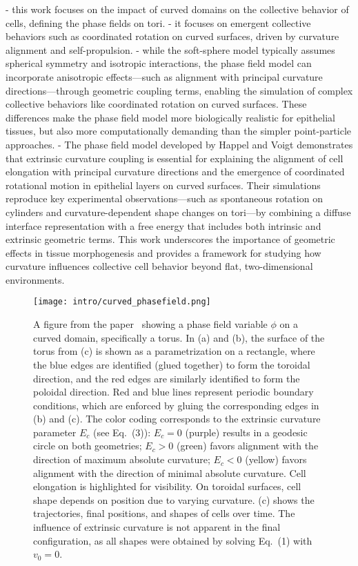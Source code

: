 - this work focuses on the impact of curved domains on the collective behavior of cells, defining the phase fields on tori. 
- it focuses on emergent collective behaviors such as coordinated rotation on curved surfaces, driven by curvature alignment and self-propulsion. 
- while the soft-sphere model typically assumes spherical symmetry and isotropic interactions, the phase field model can incorporate anisotropic effects—such as alignment with principal curvature directions—through geometric coupling terms, enabling the simulation of complex collective behaviors like coordinated rotation on curved surfaces. 
These differences make the phase field model more biologically realistic for epithelial tissues, but also more computationally demanding than the simpler point-particle approaches. 
- The phase field model developed by Happel and Voigt \cite{HV23} demonstrates that extrinsic curvature coupling is essential for explaining the alignment of cell elongation with principal curvature directions and the emergence of coordinated rotational motion in epithelial layers on curved surfaces. Their simulations reproduce key experimental observations—such as spontaneous rotation on cylinders and curvature-dependent shape changes on tori—by combining a diffuse interface representation with a free energy that includes both intrinsic and extrinsic geometric terms. This work underscores the importance of geometric effects in tissue morphogenesis and provides a framework for studying how curvature influences collective cell behavior beyond flat, two-dimensional environments.

\begin{figure}[h!]
	\centering
	\texttt{[image: intro/curved\_phasefield.png]}
	\caption{A figure from the paper~\cite{Happel2023} showing a phase field variable $\phi$ on a curved domain, specifically a torus. 
	In (a) and (b), the surface of the torus from (c) is shown as a parametrization on a rectangle, where the blue edges are identified (glued together) to form the toroidal direction, and the red edges are similarly identified to form the poloidal direction. 
	Red and blue lines represent periodic boundary conditions, which are enforced by gluing the corresponding edges in (b) and (c).
	The color coding corresponds to the extrinsic curvature parameter $E_c$ (see Eq.~(3)): $E_c = 0$ (purple) results in a geodesic circle on both geometries; $E_c > 0$ (green) favors alignment with the direction of maximum absolute curvature; $E_c < 0$ (yellow) favors alignment with the direction of minimal absolute curvature. 
	Cell elongation is highlighted for visibility. 
	On toroidal surfaces, cell shape depends on position due to varying curvature. 
	(c) shows the trajectories, final positions, and shapes of cells over time. 
	The influence of extrinsic curvature is not apparent in the final configuration, as all shapes were obtained by solving Eq.~(1) with $v_0 = 0$. 
	}
	\label{fig:curved_phasefield}
\end{figure}



